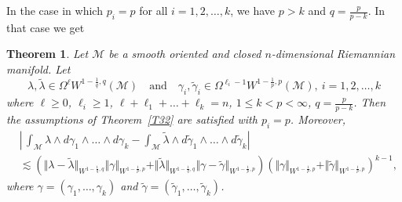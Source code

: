 \documentclass[intlimits,12pt,reqno]{amsart}
\newcommand{\cM}{\mathcal M}
\numberwithin{equation}{section}
\newtheorem{theorem}{Theorem}[section]
\theoremstyle{definition}
\begin{document}
In the case in which $p_i=p$ for all $i=1,2,\ldots,k$, we have $p>k$ and $q=\frac{p}{p-k}$. In that case we get
\begin{theorem}
\label{T33}
Let $\cM$ be a smooth oriented and closed $n$-dimensional Riemannian manifold. Let
$$
\lambda,\tilde{\lambda}\in \Omega^\ell W^{1-\frac{1}{q},q}\left(\cM\right)
\quad
\text{and}
\quad
\gamma_i,\tilde{\gamma}_i\in \Omega^{\ell_i-1}W^{1-\frac{1}{p},p}\left(\cM\right),\ i=1,2,\ldots,k
$$
where $\ell\geq 0$, $\ell_i\geq 1$,  $\ell+\ell_1+\ldots+\ell_k=n$, 
$1\leq k<p<\infty$,  $q=\frac{p}{p-k}$. Then
the assumptions of Theorem~\ref{T32} are satisfied with $p_i=p$. Moreover,
\begin{align*}
&\left|\,\int_{\cM}\lambda\wedge d\gamma_1\wedge\ldots\wedge d\gamma_k-\int_{\cM}\tilde{\lambda}\wedge d\tilde{\gamma}_1\wedge\ldots\wedge d\tilde{\gamma}_k\right|\\
&\lesssim    
\left(\Vert\lambda-\tilde{\lambda}\Vert_{W^{1-\frac{1}{q},q}}\Vert \gamma\Vert_{W^{1-\frac{1}{p},p}}
+\Vert\tilde{\lambda}\Vert_{W^{1-\frac{1}{q},q}}\Vert \gamma-\tilde{\gamma}\Vert_{W^{1-\frac{1}{p},p}}\right)
\left(\Vert \gamma\Vert_{W^{1-\frac{1}{p},p}}+\Vert \tilde{\gamma}\Vert_{W^{1-\frac{1}{p},p}}\right)^{k-1},
\end{align*}
where $\gamma=(\gamma_1,\ldots,\gamma_k)$ and $\tilde{\gamma}=(\tilde{\gamma}_1,\ldots,\tilde{\gamma}_k)$.
\end{theorem}
\end{document}
